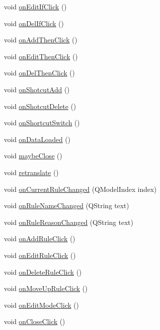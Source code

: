 \begin{DoxyCompactItemize}
void \hyperlink{class_rules_wnd_afa4a86d0a2a1cbc451806b86d5ff4772}{onEditIfClick} ()
\item 
void \hyperlink{class_rules_wnd_a17a200f59e735d1781674b0bc23a05ac}{onDelIfClick} ()
\item 
void \hyperlink{class_rules_wnd_a42db02675546175de00ac7e473585f10}{onAddThenClick} ()
\item 
void \hyperlink{class_rules_wnd_a7807dcc88f5702e5173bc18b65bcaa14}{onEditThenClick} ()
\item 
void \hyperlink{class_rules_wnd_ae6d3443e6f2aeb1c9cef3621024bf1d5}{onDelThenClick} ()
\item 
void \hyperlink{class_rules_wnd_a46bd80dde37a9d38a6ea9e0a23f049fb}{onShotcutAdd} ()
\item 
void \hyperlink{class_rules_wnd_a3a1bc2e91e25a9755dc83db6117422c2}{onShotcutDelete} ()
\item 
void \hyperlink{class_rules_wnd_acfe133aabf1eadca9cd81f4788aaa6de}{onShortcutSwitch} ()
\item 
void \hyperlink{class_rules_wnd_a6f1ace0a9f8ec0a2726b3d6584613fa8}{onDataLoaded} ()
\item 
void \hyperlink{class_rules_wnd_a1a43208f053f6998daf496edb18373ea}{maybeClose} ()
\item 
void \hyperlink{class_rules_wnd_ae447344e996476f2d34ee9312d2b53c2}{retranslate} ()
\item 
void \hyperlink{class_rules_wnd_a8150f1a8523df50614e244e53f124597}{onCurrentRuleChanged} (QModelIndex index)
\item 
void \hyperlink{class_rules_wnd_a9ec2e5369c1d22180b4dd9863e544f50}{onRuleNameChanged} (QString text)
\item 
void \hyperlink{class_rules_wnd_abd94f4267220da61e6b2b17a34f0d9b6}{onRuleReasonChanged} (QString text)
\item 
void \hyperlink{class_rules_wnd_a450cb43dffe6071ce23a2fec433dd813}{onAddRuleClick} ()
\item 
void \hyperlink{class_rules_wnd_a5a86d5777fb331aae59389aaca5e4533}{onEditRuleClick} ()
\item 
void \hyperlink{class_rules_wnd_a739a224ae93f4ce517e87d9e909a9e65}{onDeleteRuleClick} ()
\item 
void \hyperlink{class_rules_wnd_aac1e7d006451386d7ffd35f36d312950}{onMoveUpRuleClick} ()
\item 
void \hyperlink{class_rules_wnd_a3d07682984e6921b86aaf3debe899d4b}{onEditModeClick} ()
\item 
void \hyperlink{class_rules_wnd_a9ff1e5a9649409917776164e554bc0ca}{onCloseClick} ()

\end{DoxyCompactItemize}
